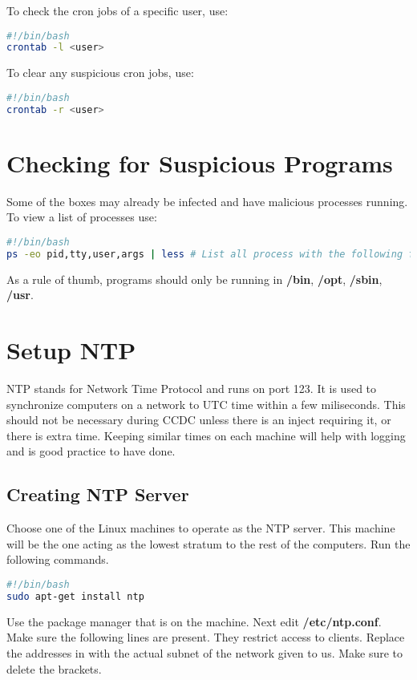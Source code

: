 \documentclass{article}
\begin{document}
To check the cron jobs of a specific user, use:

\begin{lstlisting}[language=bash]
#!/bin/bash
crontab -l <user>
\end{lstlisting}

To clear any suspicious cron jobs, use:
\begin{lstlisting}[language=bash]
#!/bin/bash
crontab -r <user>
\end{lstlisting}

\section{Checking for Suspicious Programs}
Some of the boxes may already be infected and have malicious processes running.
To view a list of processes use:

\begin{lstlisting}[language=bash]
#!/bin/bash
ps -eo pid,tty,user,args | less # List all process with the following format
\end{lstlisting}

As a rule of thumb, programs should only be running in \textbf{/bin},
\textbf{/opt}, \textbf{/sbin}, \textbf{/usr}.

\section{Setup NTP}
NTP stands for Network Time Protocol and runs on port 123. It is used to synchronize computers on a network to UTC time within a few miliseconds. This should not be necessary during CCDC unless there is an inject requiring it, or there is extra time. Keeping similar times on each 
machine will help with logging and is good practice to have done.

\subsection{Creating NTP Server}
Choose one of the Linux machines to operate as the NTP server. This machine will be the one
acting as the lowest stratum to the rest of the computers. Run the following commands.

\begin{lstlisting}[language=bash]
#!/bin/bash
sudo apt-get install ntp
\end{lstlisting}

Use the package manager that is on the machine. Next edit \textbf{/etc/ntp.conf}. Make sure the following lines are present. They restrict access to clients. Replace the addresses in {} with the actual subnet of the network given to us. Make sure to delete the brackets.
\end{document}
